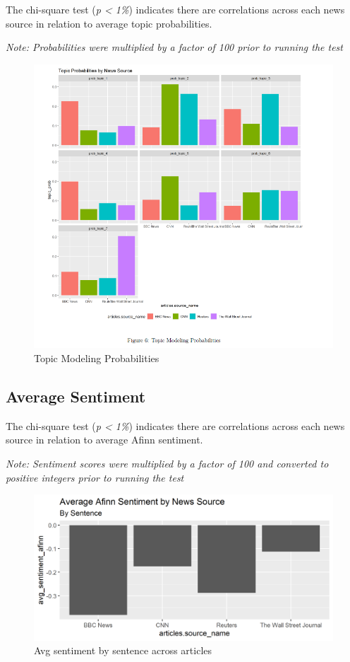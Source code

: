 \documentclass[
]{article}
\begin{document}
The chi-square test (\emph{p \textless{} 1\%}) indicates there are
correlations across each news source in relation to average topic
probabilities.

\emph{Note: Probabilities were multiplied by a factor of 100 prior to
running the test}

\begin{figure}
\centering
\includegraphics{../figures/topic_probabilities_news_source.png}
\caption{Topic Modeling Probabilities}
\end{figure}

\hypertarget{average-sentiment}{%
\subsection{Average Sentiment}\label{average-sentiment}}

The chi-square test (\emph{p \textless{} 1\%}) indicates there are
correlations across each news source in relation to average Afinn
sentiment.

\emph{Note: Sentiment scores were multiplied by a factor of 100 and
converted to positive integers prior to running the test}

\begin{figure}
\centering
\includegraphics{../figures/sentence_afinn_sentiment.png}
\caption{Avg sentiment by sentence across articles}
\end{figure}
\end{document}
